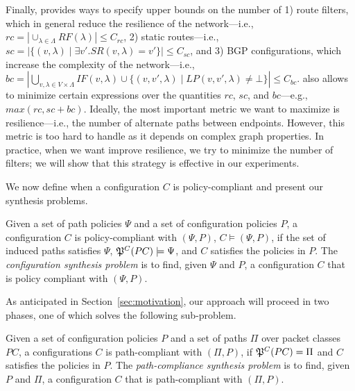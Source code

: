 Finally, \name provides ways to specify upper bounds on the number of
1) route filters, which in general reduce the resilience of the network---i.e., $rc=|\cup_{\lambda\in \Lambda} RF(\lambda)|\leq C_{rc}$,
2) static routes---i.e., $sc=|\{(v,\lambda)\mid \exists v'. SR(v,\lambda)=v'\}|\leq C_{sc}$, and
3) BGP configurations, which increase the complexity of the network---i.e., 
$bc=|\bigcup_{v,\lambda\in V\times\Lambda} IF(v,\lambda)\cup \{(v,v',\lambda)\mid LP(v,v',\lambda)\neq \bot\}|\leq C_{bc}$.
\name also allows to minimize certain expressions over the quantities $rc$, $sc$, and $bc$---e.g., $max(rc, sc+bc)$. 
Ideally, the most important metric we want to maximize is resilience---i.e.,
the number of alternate paths between endpoints.
However, this metric is too hard to handle as it depends on complex graph properties. 
In practice, when we want improve resilience, we try to minimize
the number of filters; we will show that this strategy is effective in our experiments. 




\noindent We now define when a configuration $C$ is policy-compliant
and present our synthesis problems.
\begin{definition} \label{def:policycompliance}
	Given a set of path policies $\Psi$ and a set of configuration policies $P$,
	a configuration $C$ is policy-compliant with $(\Psi,P)$,
	$C \models (\Psi,P)$, if the set of
	induced paths satisfies $\Psi$, $\mathfrak{P}^C(PC) \models \Psi$,
	and $C$ satisfies the policies in $P$.
	The \emph{configuration synthesis problem} is to find, given $\Psi$ and $P$,
a configuration $C$ that is policy compliant with $(\Psi,P)$.
\end{definition}

As anticipated in Section~\ref{sec:motivation}, our approach will proceed in two phases,
one of which solves the following sub-problem.  
\begin{definition} \label{def:pathcompliance}
Given a set of configuration policies $P$
and a set of paths $\Pi$ over packet classes $PC$,
	a configurations $C$ is path-compliant with 
	$(\Pi,P)$,
	if $\mathfrak{P}^C(PC)=\Pi$ and $C$ satisfies the policies in $P$.
	The \emph{path-compliance synthesis problem} is to find, given $P$ and $\Pi$,
a configuration $C$ that is path-compliant with $(\Pi,P)$.
\end{definition}



